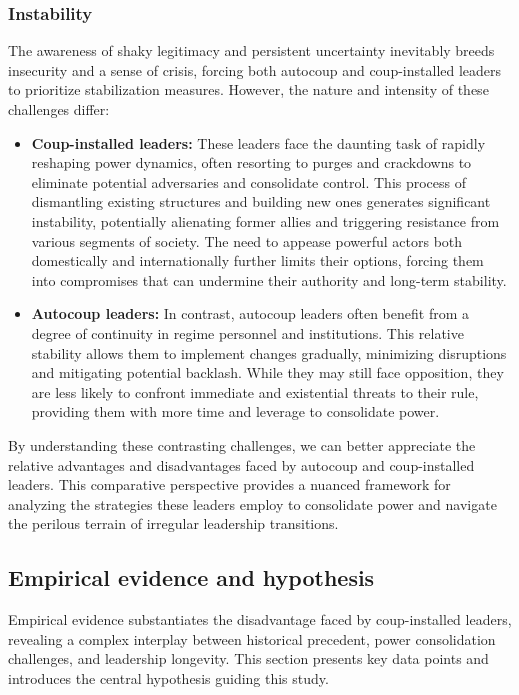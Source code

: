 \documentclass[
  12pt,
]{article}
\begin{document}
\subsubsection{Instability}\label{instability}

The awareness of shaky legitimacy and persistent uncertainty inevitably
breeds insecurity and a sense of crisis, forcing both autocoup and
coup-installed leaders to prioritize stabilization measures. However,
the nature and intensity of these challenges differ:

\begin{itemize}
\item
  \textbf{Coup-installed leaders:} These leaders face the daunting task
  of rapidly reshaping power dynamics, often resorting to purges and
  crackdowns to eliminate potential adversaries and consolidate control.
  This process of dismantling existing structures and building new ones
  generates significant instability, potentially alienating former
  allies and triggering resistance from various segments of society. The
  need to appease powerful actors both domestically and internationally
  further limits their options, forcing them into compromises that can
  undermine their authority and long-term stability.
\item
  \textbf{Autocoup leaders:} In contrast, autocoup leaders often benefit
  from a degree of continuity in regime personnel and institutions. This
  relative stability allows them to implement changes gradually,
  minimizing disruptions and mitigating potential backlash. While they
  may still face opposition, they are less likely to confront immediate
  and existential threats to their rule, providing them with more time
  and leverage to consolidate power.
\end{itemize}

By understanding these contrasting challenges, we can better appreciate
the relative advantages and disadvantages faced by autocoup and
coup-installed leaders. This comparative perspective provides a nuanced
framework for analyzing the strategies these leaders employ to
consolidate power and navigate the perilous terrain of irregular
leadership transitions.

\subsection{Empirical evidence and
hypothesis}\label{empirical-evidence-and-hypothesis}

Empirical evidence substantiates the disadvantage faced by
coup-installed leaders, revealing a complex interplay between historical
precedent, power consolidation challenges, and leadership longevity.
This section presents key data points and introduces the central
hypothesis guiding this study.
\end{document}
